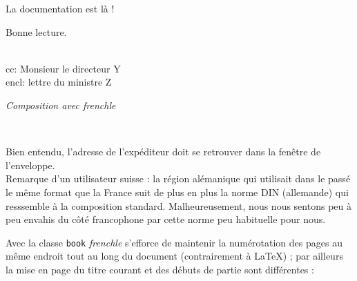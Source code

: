 \documentclass[a4paper,12pt,openright]{article}
\begin{document}
\begin{center}
{{\begin{minipage}{61mm}
La documentation est là !\\[1ex]
\centerline{\phantom{Bonne lecture.}Bonne lecture.}\\[11ex]
cc: Monsieur le directeur Y\\[.5ex]
encl: lettre du ministre Z
\end{minipage}
}
}%
\parbox[t]{66mm}{
\begin{center} \frenchtypography \frenchlayout
\textit{Composition avec frenchle}  
\end{center}
}\\[1.5em]
%
\end{center} %

Bien entendu, l’adresse de l’expéditeur doit se retrouver dans la fenêtre de
l’enveloppe.\\

\MAJ Remarque d'un utilisateur suisse : la région alémanique qui utilisait
 dans le passé le même format que
 la France suit de plus en plus la norme DIN (allemande) qui resssemble à la composition standard.
 Malheureusement, nous nous sentons peu à peu envahis du côté francophone par cette norme peu habituelle
pour nous.\endMAJ 

Avec la classe \texttt{book} \textit{frenchle} s’efforce de maintenir la numérotation des
pages au même endroit tout au long du document (contrairement à \LaTeX) ; par
ailleurs la mise en page du titre courant et des débuts de partie sont différentes :
\end{document}
